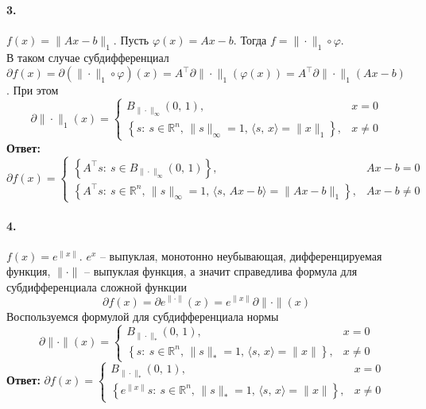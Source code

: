 \documentclass{article}
\newcommand*{\R}{\mathbb{R}}
\begin{document}
\paragraph{3.} $f(x) = \| Ax - b \|_1$. Пусть $\varphi(x) = Ax - b$. Тогда $f = \| \cdot \|_1 \circ \varphi$. \\
В таком случае субдифференциал $\partial f(x) = \partial(\| \cdot \|_1 \circ \varphi)(x) = A^{\top} \partial \| \cdot \|_1(\varphi(x)) = A^{\top} \partial \| \cdot \|_1 (Ax - b)$. При этом
\[ \partial \| \cdot \|_1 (x) = \begin{cases}
    B_{\| \cdot \|_\infty}(0,\, 1), & x = 0 \\
    \left\{ s :\: s \in \R^n,\, \| s \|_\infty = 1,\, \langle s,\, x \rangle = \| x \|_1 \right\}, & x \neq 0 
\end{cases} \]
\textbf{Ответ:} $\partial f(x) = \begin{cases}
    \left\{ A^\top s :\: s \in B_{\| \cdot \|_\infty}(0,\, 1) \right\}, & Ax - b = 0 \\
    \left\{ A^\top s :\: s \in \R^n,\, \| s \|_\infty = 1,\, \langle s,\, Ax - b \rangle = \| Ax - b \|_1 \right\}, & Ax - b \neq 0 
\end{cases}$ 


\paragraph{4.} $f(x) = e^{\| x \|}$. $e^x$ -- выпуклая, монотонно неубывающая, дифференцируемая функция, $\| \cdot \|$ -- выпуклая функция, а значит справедлива формула для субдифференциала сложной функции \\
\[ \partial f(x) = \partial e^{\| \cdot \|}(x) = e^{\| x \|} \partial \| \cdot \|(x) \]
Воспользуемся формулой для субдифференциала нормы
\[ \partial \| \cdot \| (x) = \begin{cases}
    B_{\| \cdot \|_\ast}(0,\, 1), & x = 0 \\
    \left\{ s :\: s \in \R^n,\, \| s \|_\ast = 1,\, \langle s,\, x \rangle = \| x \| \right\}, & x \neq 0 
\end{cases} \]
\textbf{Ответ:} $\partial f(x) = \begin{cases}
    B_{\| \cdot \|_\ast}(0,\, 1), & x = 0 \\
    \left\{ e^{\| x \|} s :\: s \in \R^n,\, \| s \|_\ast = 1,\, \langle s,\, x \rangle = \| x \| \right\}, & x \neq 0 
\end{cases}$ 
\end{document}
